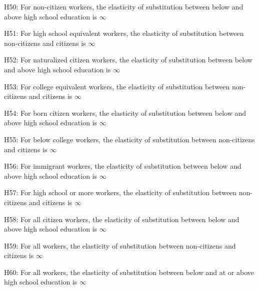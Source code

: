 \documentclass[11pt]{article}
\theoremstyle{definition}
\theoremstyle{remark}
\begin{document}
{H50: For non-citizen workers, the elasticity of substitution between below and above high school education is $\infty$

H51: For high school equivalent workers, the elasticity of substitution between non-citizens and citizens is $\infty$

H52: For naturalized citizen workers, the elasticity of substitution between below and above high school education is $\infty$

H53: For college equivalent workers, the elasticity of substitution between non-citizens and citizens is $\infty$

H54: For born citizen workers, the elasticity of substitution between below and above high school education is $\infty$

H55: For below college workers, the elasticity of substitution between non-citizens and citizens is $\infty$

H56: For immigrant workers, the elasticity of substitution between below and above high school education is $\infty$

H57: For high school or more workers, the elasticity of substitution between non-citizens and citizens is $\infty$

H58: For all citizen workers, the elasticity of substitution between below and above high school education is $\infty$

H59: For all workers, the elasticity of substitution between non-citizens and citizens is $\infty$

H60: For all workers, the elasticity of substitution between below and at or above high school education is $\infty$
}


\end{document}
